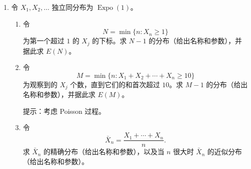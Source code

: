 \documentclass[UTF8, 12pt, fontset=fandol, oneside]{ctexart}
\begin{document}
\begin{enumerate}
\begin{enumerate}
    提示：考虑
    \[
      \frac{X_1}{X_1+\cdots+X_n}
      +\frac{X_2}{X_1+\cdots+X_n}
      +\cdots+
      \frac{X_n}{X_1+\cdots+X_n}.
    \]
    \item 当 $n\to\infty$ 时，$nW_n$ 以概率 $1$ 收敛到哪个随机变量？
    \item 若 $X_j\sim\operatorname{Expo}(\lambda)$，求 $W_n$ 的分布，最好不用微积分。（若它是本书中学过的命名分布之一，请给出名称并说明参数；否则给出 PDF。）
  \end{enumerate}

  \item 令 $X_1,X_2,\ldots$ 独立同分布为 $\operatorname{Expo}(1)$。
  \begin{enumerate}
    \item 令
    \[
      N=\min\{n:X_n\ge 1\}
    \]
    为第一个超过 $1$ 的 $X_j$ 的下标。求 $N-1$ 的分布（给出名称和参数），并据此求 $E(N)$。
    \item 令
    \[
      M=\min\{n:X_1+X_2+\cdots+X_n\ge 10\}
    \]
    为观察到的 $X_j$ 个数，直到它们的和首次超过 $10$。求 $M-1$ 的分布（给出名称和参数），并据此求 $E(M)$。

    提示：考虑 Poisson 过程。
    \item 令
    \[
      \bar X_n=\frac{X_1+\cdots+X_n}{n}.
    \]
    求 $\bar X_n$ 的精确分布（给出名称和参数），以及当 $n$ 很大时 $\bar X_n$ 的近似分布（给出名称和参数）。
  \end{enumerate}
\end{enumerate}
\end{document}
